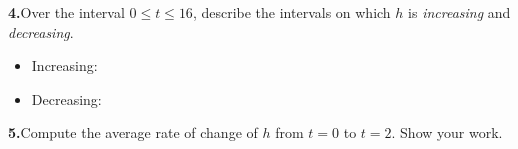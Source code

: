 \documentclass[10pt]{article}
\begin{document}
\begin{tcolorbox}[colback=white, colframe=black!40,
    title=\textbf{Tier A --- Apply},
    fonttitle=\bfseries, arc=2mm, left=3mm, right=3mm, top=2mm, bottom=2mm]
\vspace{4pt}
\textbf{4.}\quad Over the interval $0 \leq t \leq 16$, describe the intervals
on which $h$ is \emph{increasing} and \emph{decreasing}.

\vspace{4pt}
\begin{itemize}[leftmargin=1.4em, itemsep=3pt]
  \item Increasing: \writeline
  \item Decreasing: \writeline
\end{itemize}

\vspace{4pt}
\textbf{5.}\quad Compute the average rate of change of $h$ from $t=0$ to $t=2$.
Show your work.

\end{tcolorbox}

\vspace{0.08in}
\end{document}
